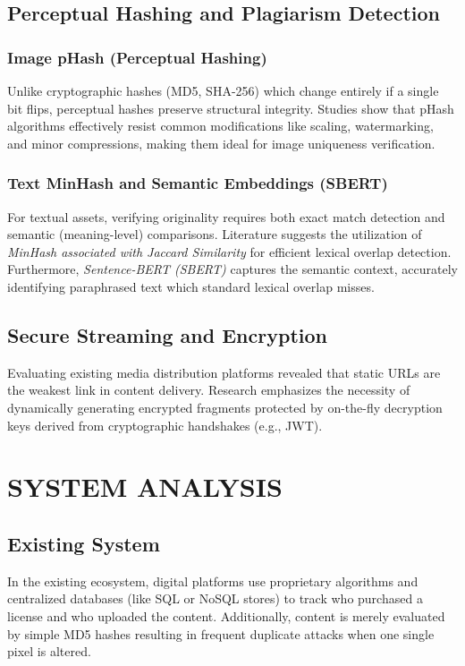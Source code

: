 \documentclass[12pt,a4paper]{report}
\begin{document}
\section{Perceptual Hashing and Plagiarism Detection}
\subsection{Image pHash (Perceptual Hashing)}
Unlike cryptographic hashes (MD5, SHA-256) which change entirely if a single bit flips, perceptual hashes preserve structural integrity. Studies show that pHash algorithms effectively resist common modifications like scaling, watermarking, and minor compressions, making them ideal for image uniqueness verification.

\subsection{Text MinHash and Semantic Embeddings (SBERT)}
For textual assets, verifying originality requires both exact match detection and semantic (meaning-level) comparisons. Literature suggests the utilization of \textit{MinHash associated with Jaccard Similarity} for efficient lexical overlap detection. Furthermore, \textit{Sentence-BERT (SBERT)} captures the semantic context, accurately identifying paraphrased text which standard lexical overlap misses.

\section{Secure Streaming and Encryption}
Evaluating existing media distribution platforms revealed that static URLs are the weakest link in content delivery. Research emphasizes the necessity of dynamically generating encrypted fragments protected by on-the-fly decryption keys derived from cryptographic handshakes (e.g., JWT). 

\chapter{SYSTEM ANALYSIS}

\section{Existing System}
In the existing ecosystem, digital platforms use proprietary algorithms and centralized databases (like SQL or NoSQL stores) to track who purchased a license and who uploaded the content. Additionally, content is merely evaluated by simple MD5 hashes resulting in frequent duplicate attacks when one single pixel is altered.
\end{document}

